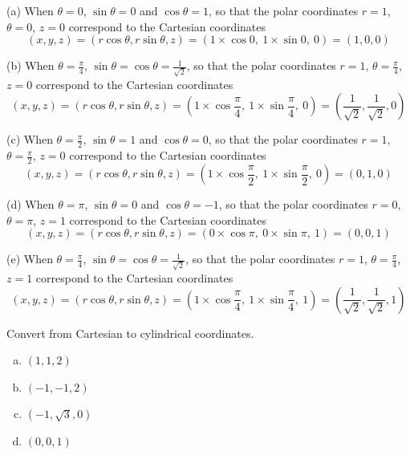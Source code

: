 \begin{solution}
(a) When $\theta=0$,  $\sin\theta=0$ and $\cos\theta=1$, so that
the polar coordinates $r=1$, $\theta=0$, $z=0$ correspond to the Cartesian
coordinates
\begin{equation*}
(x,y,z) = (r\cos\theta,r\sin\theta,z)
        = (1\times\cos 0,\  1\times\sin 0,\ 0)
        =(1,0,0)
\end{equation*}

(b) When $\theta=\frac{\pi}{4}$,  $\sin\theta=\cos\theta=\frac{1}{\sqrt{2}}$, 
so that the polar coordinates $r=1$, $\theta=\frac{\pi}{4}$, $z=0$ correspond 
to the Cartesian coordinates
\begin{equation*}
(x,y,z) = (r\cos\theta,r\sin\theta,z)
  = \left(1\times\cos \frac{\pi}{4},\  1\times\sin \frac{\pi}{4},\ 0\right)
  = \left(\frac{1}{\sqrt{2}},\frac{1}{\sqrt{2}},0\right)
\end{equation*}

(c) When $\theta=\frac{\pi}{2}$,  $\sin\theta=1$ and $\cos\theta=0$, 
so that the polar coordinates $r=1$, $\theta=\frac{\pi}{2}$, $z=0$ correspond 
to the Cartesian coordinates
\begin{equation*}
(x,y,z) = (r\cos\theta,r\sin\theta,z)
  = \left(1\times\cos \frac{\pi}{2},\  1\times\sin \frac{\pi}{2},\ 0\right)
  = (0,1,0)
\end{equation*}

(d) When $\theta=\pi$,  $\sin\theta=0$ and $\cos\theta=-1$, 
so that the polar coordinates $r=0$, $\theta=\pi$, $z=1$ correspond 
to the Cartesian coordinates
\begin{equation*}
(x,y,z) = (r\cos\theta,r\sin\theta,z)
  = \left(0\times\cos\pi,\  0\times\sin\pi,\ 1\right)
  = (0,0,1)
\end{equation*}

(e) When $\theta=\frac{\pi}{4}$,  $\sin\theta=\cos\theta=\frac{1}{\sqrt{2}}$, 
so that the polar coordinates $r=1$, $\theta=\frac{\pi}{4}$, $z=1$ correspond 
to the Cartesian coordinates
\begin{equation*}
(x,y,z) = (r\cos\theta,r\sin\theta,z)
  = \left(1\times\cos \frac{\pi}{4},\  1\times\sin \frac{\pi}{4},\ 1\right)
  = \left(\frac{1}{\sqrt{2}},\frac{1}{\sqrt{2}},1\right)
\end{equation*}

\end{solution}

\begin{question}
Convert from Cartesian to cylindrical coordinates.
\begin{enumerate}[(a)]
\item $(1,1,2)$
\item $(-1,-1,2)$
\item $(-1,\sqrt{3}, 0)$
\item $(0,0,1)$
\end{enumerate}

\end{question}


